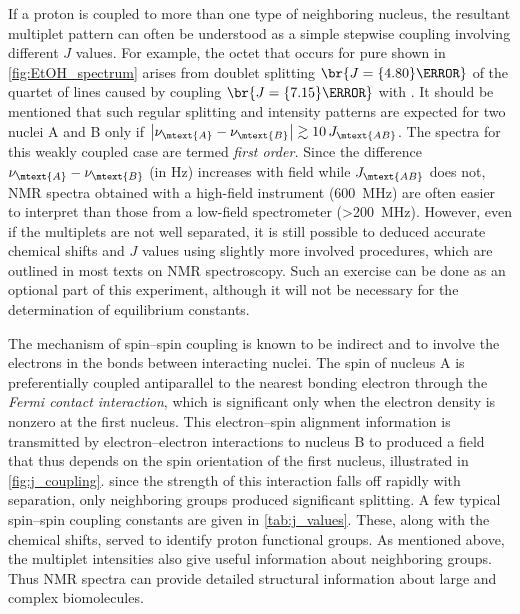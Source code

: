 \documentclass[nobib,nofonts,nols,nohyper]{tufte-handout}
\begin{document}
If a proton is coupled to more than one type of neighboring nucleus, the resultant multiplet pattern can often be understood as a simple stepwise coupling involving different \( J \) values.
For example, the  octet that occurs for pure  shown in \cref{fig:EtOH_spectrum} arises from  doublet splitting \( \br{J = \qty{4.80}{\Hz}} \) of the quartet of lines caused by coupling \( \br{J = \qty{7.15}{\Hz}} \) with . 
It should be mentioned that such regular splitting and intensity patterns are expected for two nuclei A and B only if \( \abs{\nu_\mtext{A} - \nu_\mtext{B}} \gtrsim 10\,J_\mtext{AB} \). 
The spectra for this weakly coupled case are termed \emph{first order.}
Since the difference \( \nu_\mtext{A} - \nu_\mtext{B} \) (in \unit{\Hz}) increases with field while \( J_\mtext{AB} \) does not, NMR spectra obtained with a high-field instrument (\qty{600}{\MHz}) are often easier to interpret than those from a low-field spectrometer (\qty{>200}{\MHz}). 
However, even if the multiplets are not well separated, it is still possible to deduced accurate chemical shifts and \( J \) values using slightly more involved procedures, which are outlined in most texts on NMR spectroscopy.\autocite{davis1965advanced,pople1959nmr,silverstein2005spec,burdett1964a,rogers1956a}
Such an exercise can be done as an optional part of this experiment, although it will not be necessary for the determination of equilibrium constants. 

The mechanism of spin--spin coupling is known to be indirect and to involve the electrons in the bonds between interacting nuclei. 
The spin of nucleus A is preferentially coupled antiparallel to the nearest bonding electron through the \emph{Fermi contact interaction}, which is significant only when the electron density is nonzero at the first nucleus.
This electron--spin alignment information is transmitted by electron--electron interactions to nucleus B to produced a field that thus depends on the spin orientation of the first nucleus, illustrated in \cref{fig:j_coupling}. 
since the strength of this interaction falls off rapidly with separation, only neighboring groups produced significant splitting. 
A few typical spin--spin coupling constants are given in \cref{tab:j_values}. 
These, along with the chemical shifts, served to identify proton functional groups. 
As mentioned above, the multiplet intensities also give useful information about neighboring groups. 
Thus NMR spectra can provide detailed structural information about large and complex biomolecules. 
\end{document}
